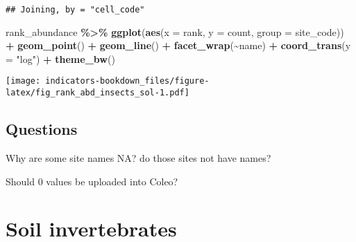 \documentclass[
]{book}
\newenvironment{Shaded}{\begin{snugshade}}{\end{snugshade}}
\newcommand{\CommentTok}[1]{\textcolor[rgb]{0.56,0.35,0.01}{\textit{#1}}}
\newcommand{\DataTypeTok}[1]{\textcolor[rgb]{0.13,0.29,0.53}{#1}}
\newcommand{\KeywordTok}[1]{\textcolor[rgb]{0.13,0.29,0.53}{\textbf{#1}}}
\newcommand{\NormalTok}[1]{#1}
\newcommand{\OperatorTok}[1]{\textcolor[rgb]{0.81,0.36,0.00}{\textbf{#1}}}
\newcommand{\StringTok}[1]{\textcolor[rgb]{0.31,0.60,0.02}{#1}}
\begin{document}
\begin{verbatim}
## Joining, by = "cell_code"
\end{verbatim}

\begin{Shaded}
\begin{Highlighting}[]
\NormalTok{rank\_abundance }\OperatorTok{\%\textgreater{}\%}\StringTok{ }
\StringTok{  }\KeywordTok{ggplot}\NormalTok{(}\KeywordTok{aes}\NormalTok{(}\DataTypeTok{x =}\NormalTok{ rank, }\DataTypeTok{y =}\NormalTok{ count, }\DataTypeTok{group =}\NormalTok{ site\_code)) }\OperatorTok{+}\StringTok{ }
\StringTok{  }\KeywordTok{geom\_point}\NormalTok{() }\OperatorTok{+}\StringTok{ }
\StringTok{  }\KeywordTok{geom\_line}\NormalTok{() }\OperatorTok{+}\StringTok{ }
\StringTok{  }\KeywordTok{facet\_wrap}\NormalTok{(}\OperatorTok{\textasciitilde{}}\NormalTok{name) }\OperatorTok{+}\StringTok{ }
\StringTok{  }\KeywordTok{coord\_trans}\NormalTok{(}\DataTypeTok{y =} \StringTok{"log"}\NormalTok{) }\OperatorTok{+}\StringTok{ }
\StringTok{  }\KeywordTok{theme\_bw}\NormalTok{()}
\end{Highlighting}
\end{Shaded}

\texttt{[image: indicators-bookdown\_files/figure-latex/fig\_rank\_abd\_insects\_sol-1.pdf]}

\hypertarget{questions-1}{%
\section{Questions}\label{questions-1}}

Why are some site names NA? do those sites not have names?

Should 0 values be uploaded into Coleo?

\hypertarget{soil-invertebrates-1}{%
\chapter{Soil invertebrates}\label{soil-invertebrates-1}}

\begin{Shaded}
\end{Shaded}
\end{document}
